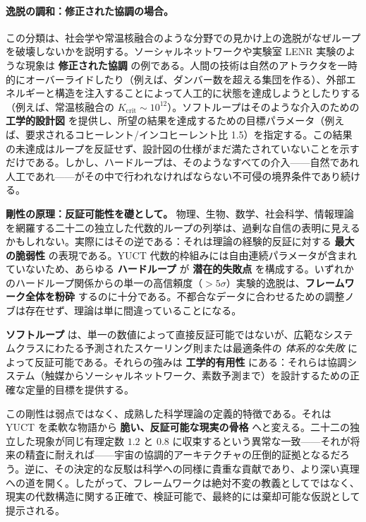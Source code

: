 \documentclass[12pt,a4paper]{article}
\begin{document}
	\paragraph{逸脱の調和：修正された協調の場合。}
	この分類は、社会学や常温核融合のような分野での見かけ上の逸脱がなぜループを破壊しないかを説明する。ソーシャルネットワークや実験室 LENR 実験のような現象は \textbf{修正された協調} の例である。人間の技術は自然のアトラクタを一時的にオーバーライドしたり（例えば、ダンバー数を超える集団を作る）、外部エネルギーと構造を注入することによって人工的に状態を達成しようとしたりする（例えば、常温核融合の \(K_{\mathrm{crit}} \sim 10^{12}\)）。ソフトループはそのような介入のための \textbf{工学的設計図} を提供し、所望の結果を達成するための目標パラメータ（例えば、要求されるコヒーレント/インコヒーレント比 1.5）を指定する。この結果の未達成はループを反証せず、設計図の仕様がまだ満たされていないことを示すだけである。しかし、ハードループは、そのようなすべての介入——自然であれ人工であれ——がその中で行われなければならない不可侵の境界条件であり続ける。
	
	\vspace{0.5cm}
	\noindent
	\textbf{剛性の原理：反証可能性を礎として。}
	物理、生物、数学、社会科学、情報理論を網羅する二十二の独立した代数的ループの列挙は、過剰な自信の表明に見えるかもしれない。実際にはその逆である：それは理論の経験的反証に対する \textbf{最大の脆弱性} の表現である。YUCT 代数的枠組みには自由連続パラメータが含まれていないため、あらゆる \textbf{ハードループ} が \textbf{潜在的失敗点} を構成する。いずれかのハードループ関係からの単一の高信頼度（\(>5\sigma\)）実験的逸脱は、\textbf{フレームワーク全体を粉砕} するのに十分である。不都合なデータに合わせるための調整ノブは存在せず、理論は単に間違っていることになる。
	
	\textbf{ソフトループ} は、単一の数値によって直接反証可能ではないが、広範なシステムクラスにわたる予測されたスケーリング則または最適条件の \textit{体系的な失敗} によって反証可能である。それらの強みは \textbf{工学的有用性} にある：それらは協調システム（触媒からソーシャルネットワーク、素数予測まで）を設計するための正確な定量的目標を提供する。
	
	この剛性は弱点ではなく、成熟した科学理論の定義的特徴である。それは YUCT を柔軟な物語から \textbf{脆い、反証可能な現実の骨格} へと変える。二十二の独立した現象が同じ有理定数 \(1.2\) と \(0.8\) に収束するという異常な一致——それが将来の精査に耐えれば——宇宙の協調的アーキテクチャの圧倒的証拠となるだろう。逆に、その決定的な反駁は科学への同様に貴重な貢献であり、より深い真理への道を開く。したがって、フレームワークは絶対不変の教義としてではなく、現実の代数構造に関する正確で、検証可能で、最終的には棄却可能な仮説として提示される。
	
\end{document}
